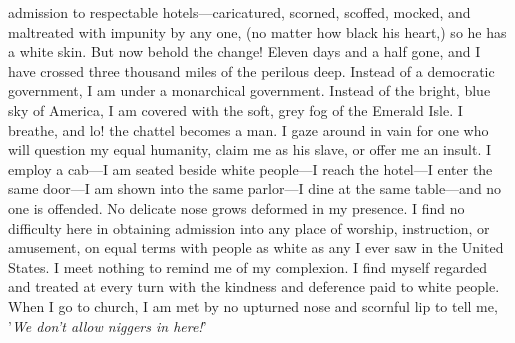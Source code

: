 admission to respectable hotels---caricatured, scorned,
{\protect\hypertarget{371}{}{}}scoffed, mocked, and maltreated with
impunity by any one, (no matter how black his heart,) so he has a white
skin. But now behold the change! Eleven days and a half gone, and I have
crossed three thousand miles of the perilous deep. Instead of a
democratic government, I am under a monarchical government. Instead of
the bright, blue sky of America, I am covered with the soft, grey fog of
the Emerald Isle. I breathe, and lo! the chattel becomes a man. I gaze
around in vain for one who will question my equal humanity, claim me as
his slave, or offer me an insult. I employ a cab---I am seated beside
white people---I reach the hotel---I enter the same door---I am shown
into the same parlor---I dine at the same table---and no one is
offended. No delicate nose grows deformed in my presence. I find no
difficulty here in obtaining admission into any place of worship,
instruction, or amusement, on equal terms with people as white as any I
ever saw in the United States. I meet nothing to remind me of my
complexion. I find myself regarded and treated at every turn with the
kindness and deference paid to white people. When I go to church, I am
met by no upturned nose and scornful lip to tell me, {'}\emph{We don't
allow niggers in here!}{'}

